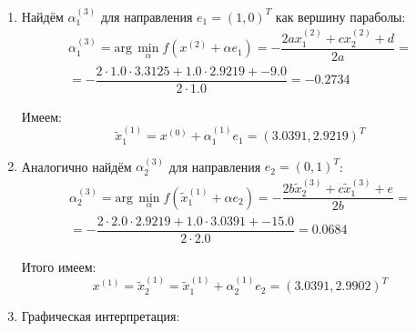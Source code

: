 \documentclass[12pt]{article}
\begin{document}
\begin{enumerate}
  \item Найдём $\alpha^{(3)}_1$ для направления $e_1=(1,0)^T$ как вершину параболы:
  \[
  \begin{gathered}
    \alpha^{(3)}_1=\textrm{arg}\,\min_{\alpha}f(x^{(2)}+\alpha e_1)=-\dfrac{2ax^{(2)}_1+cx^{(2)}_2+d}{2a}=\\
    =-\dfrac{2\cdot 1.0\cdot 3.3125+1.0\cdot 2.9219+-9.0}{2\cdot 1.0}=-0.2734
  \end{gathered}
  \]

  Имеем:
  \[
    \tilde{x}_1^{(1)}=x^{(0)}+\alpha_1^{(1)}e_1=(3.0391,2.9219)^T
  \]

  \item Аналогично найдём $\alpha^{(3)}_2$ для направления $e_2=(0,1)^T$:
  \[
  \begin{gathered}
    \alpha^{(3)}_2=\textrm{arg}\,\min_{\alpha}f(\tilde{x}^{(1)}_1+\alpha e_2)=-\dfrac{2b\tilde{x}^{(3)}_2+c\tilde{x}^{(3)}_1+e}{2b}=\\
    =-\dfrac{2\cdot 2.0\cdot 2.9219+1.0\cdot 3.0391+-15.0}{2\cdot 2.0}=0.0684
  \end{gathered}
  \]

  Итого имеем:
  \[
    x^{(1)}=\tilde{x}_2^{(1)}=\tilde{x}^{(1)}_1+\alpha_2^{(1)}e_2=(3.0391,2.9902)^T
  \]

  \item Графическая интерпретация:
  \begin{figure}[H]
  \centering
\end{figure}
\end{enumerate}
\end{document}
